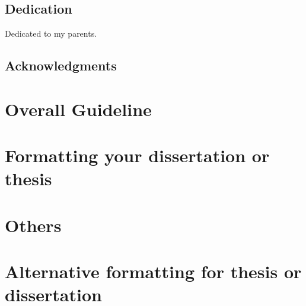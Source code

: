 \documentclass[letterpaper,12pt]{report}
\begin{document}
\setcounter{page}{0}



\newpage
\onehalfspace
\begin{abstract}

\end{abstract}

\setcounter{page}{3}
\doublespacing

\newpage
\begin{center}
\section*{Dedication}
Dedicated to my parents.
\end{center}

\newpage
\section*{Acknowledgments}


\newpage
\renewcommand*\contentsname{Table of Contents}
\tableofcontents

\newpage
\listoftables

\newpage
\listoffigures

\newpage

\setcounter{page}{1}
\linespread{2}

\chapter{ Overall Guideline }\label{chap:intro}


\chapter{ Formatting your dissertation or thesis }\label{chap:related_work}


\chapter{ Others }\label{chap:prob_def}


\chapter{Alternative formatting for thesis or dissertation}\label{chap:gbplanner}



\renewcommand{\bibname}{ References }

\end{document}
